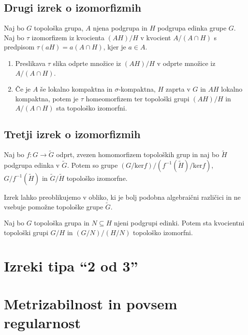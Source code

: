 \documentclass[mat1]{fmfdelo}
\begin{document}
\subsection{Drugi izrek o izomorfizmih}
\begin{izrek}\label{izr:drugitopizrek}
Naj bo $G$ topološka grupa, $A$ njena podgrupa in $H$ podgrupa edinka grupe $G$. Naj bo $\tau$ izomorfizem iz kvocienta $(AH)/H$ v kvocient $A/(A \cap H)$ s predpisom $\tau (aH) = a(A \cap H)$, kjer je $a \in A$.
\begin{enumerate}
\item Preslikava $\tau$ slika odprte množice iz $(AH)/H$ v odprte množice iz $A/(A \cap H)$.
\item Če je $A$ še lokalno kompaktna in $\sigma$-kompaktna, $H$ zaprta v $G$ in $AH$ lokalno kompaktna, potem je $\tau$ homeomorfizem ter topološki grupi $(AH)/H$ in $A/(A \cap H)$ sta topološko izomorfni.
\end{enumerate}
\end{izrek}


\subsection{Tretji izrek o izomorfizmih}
\begin{izrek}\label{izr:predtretji}
	Naj bo $f\colon G \to \widetilde{G}$ odprt, zvezen homomorfizem topoloških grup in naj bo $\widetilde{H}$ podgrupa edinka v $\widetilde{G}$. Potem so grupe $(G/\text{ker}f)/(f^{-1}(\widetilde{H})/\text{ker}f)$, $G/f^{-1}(\widetilde{H})$ in $\widetilde{G}/\widetilde{H}$ topološko izomorfne.
\end{izrek}

Izrek lahko preoblikujemo v obliko, ki je bolj podobna algebraični različici in ne vsebuje pomožne topološke grupe $\widetilde{G}$.
\begin{izrek}\label{izr:tretjitopizrek}
Naj bo $G$ topološka grupa in $N \subseteq H$ njeni podgrupi edinki. Potem sta kvocientni topološki grupi $G/H$ in $(G/N)/(H/N)$ topološko izomorfni.
\end{izrek}

\section{Izreki tipa ``2 od 3''}

\section{Metrizabilnost in povsem regularnost}
\end{document}
